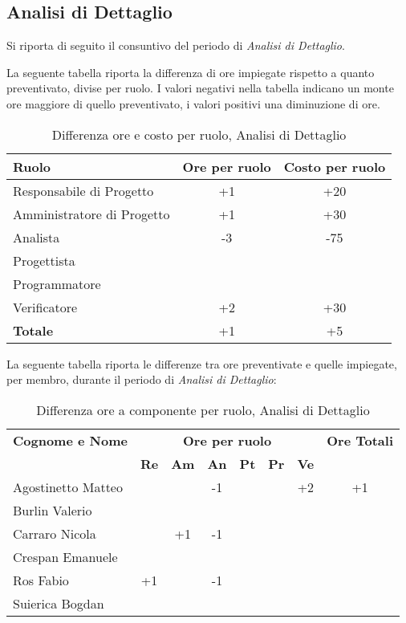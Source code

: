 \subsection{Analisi di Dettaglio}
Si riporta di seguito il consuntivo del periodo di \textit{Analisi di Dettaglio}.

\noindent La seguente tabella riporta la differenza di ore impiegate rispetto a quanto preventivato, divise per ruolo. I valori negativi nella tabella indicano un monte ore maggiore di quello preventivato, i valori positivi una diminuzione di ore.

\begin{table}[h]
	\centering
	\begin{tabular}{|l|c|c|}
		\toprule
		\textbf{Ruolo} & \textbf{Ore per ruolo} & \textbf{Costo per ruolo} \\
		
		\midrule
		Responsabile di Progetto & +1 & +20 \\
		Amministratore di Progetto & +1 & +30 \\ 
		Analista & -3 & -75 \\
		Progettista & & \\
		Programmatore & & \\
		Verificatore & +2 & +30 \\
		\midrule
		\textbf{Totale} & +1 & +5 \\
		
		\bottomrule
	\end{tabular}
	\caption{Differenza ore e costo per ruolo, Analisi di Dettaglio}
	\label{tab4}
\end{table} 

\noindent La seguente tabella riporta le differenze tra ore preventivate e quelle impiegate, per membro, durante il periodo di \textit{Analisi di Dettaglio}: 
\begin{table}[h]
	\centering
	\begin{tabular}{|l|c|c|c|c|c|c|c|}
		\toprule
		\textbf{Cognome e Nome} & \multicolumn{6}{c}{\textbf{Ore per ruolo}} & \textbf{Ore Totali} \\
		& \textbf{Re} & \textbf{Am} & \textbf{An} & \textbf{Pt} & \textbf{Pr} & \textbf{Ve} & \\
		
		\midrule
		Agostinetto Matteo & & & -1 & & & +2 & +1 \\
		Burlin Valerio & & & & & & & \\ 
		Carraro Nicola & & +1 & -1 & & & & \\
		Crespan Emanuele & & & & & & & \\
		Ros Fabio & +1 & & -1 & & & & \\
		Suierica Bogdan & & & & & & & \\
		
		\bottomrule
	\end{tabular}
	\caption{Differenza ore a componente per ruolo, Analisi di Dettaglio}
\end{table}

